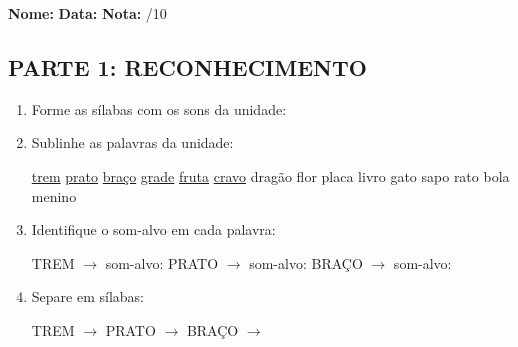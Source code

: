 \begin{exercicio}

\noindent\textbf{Nome:} \underline{\hspace{3.2cm}} \quad \textbf{Data:} \underline{\hspace{1.6cm}} \quad \textbf{Nota:} \underline{\hspace{0.9cm}}/10


\subsection*{PARTE 1: RECONHECIMENTO}

\begin{enumerate}

  \item Forme as sílabas com os sons da unidade:

\begin{center}
\end{center}

  \item Sublinhe as palavras da unidade:

\begin{center}
  \uline{trem} \quad \uline{prato} \quad \uline{braço} \quad \uline{grade} \quad \uline{fruta} \quad \uline{cravo} \quad dragão \quad flor \quad placa \quad livro \quad gato \quad sapo \quad rato \quad bola \quad menino
\end{center}

  \item Identifique o som-alvo em cada palavra:
  \begin{center}
  TREM $\rightarrow$ som-alvo: \underline{\hspace{1cm}} \quad PRATO $\rightarrow$ som-alvo: \underline{\hspace{1cm}} \quad BRAÇO $\rightarrow$ som-alvo: \underline{\hspace{1cm}}
  \end{center}

  \item Separe em sílabas:
  \begin{center}
  TREM $\rightarrow$ \underline{\hspace{1cm}} \quad PRATO $\rightarrow$ \underline{\hspace{1cm}} \quad BRAÇO $\rightarrow$ \underline{\hspace{1cm}}
  \end{center}


\end{enumerate}
\end{exercicio}
